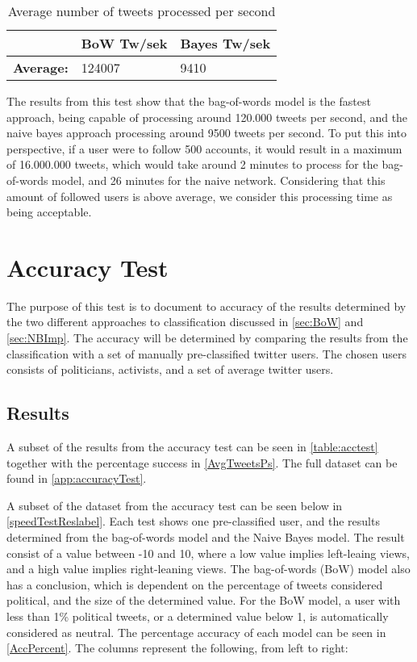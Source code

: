 \begin{table}[H]\centering
\begin{tabular}{|l|l|l|}\hline
					&	\textbf{BoW Tw/sek}	&	\textbf{Bayes Tw/sek}	\\\hline
\textbf{Average:}	&	124007				&	9410 					\\\hline	
\end{tabular}
\caption{Average number of tweets processed per second}
\label{AvgTweetsPs}
\end{table}

The results from this test show that the bag-of-words model is the fastest
approach, being capable of processing around 120.000 tweets per second, and the
naive bayes approach processing around 9500 tweets per second. To put this into
perspective, if a user were to follow 500 accounts, it would result in a maximum
of 16.000.000 tweets, which would take around 2 minutes to process for the
bag-of-words model, and 26 minutes for the naive network. Considering that this
amount of followed users is above average, we consider this processing time as
being acceptable.








\section{Accuracy Test}
The purpose of this test is to document to accuracy of the results determined
by the two different approaches to classification discussed in \autoref{sec:BoW}
and \autoref{sec:NBImp}. The accuracy will be determined by comparing the
results from the classification with a set of manually pre-classified
twitter users. The chosen users consists of politicians, activists, and a set of
average twitter users.

\subsection*{Results}
A subset of the results from the accuracy test can be seen in
\autoref{table:acctest} together with the percentage success in
\autoref{AvgTweetsPs}. The full dataset can be found in
\autoref{app:accuracyTest}.\nl

A subset of the dataset from the accuracy test can be seen below in
\autoref{speedTestReslabel}. Each test shows one pre-classified user, and the
results determined from the bag-of-words model and the Naive Bayes model. The
result consist of a value between -10 and 10, where a low value implies
left-leaing views, and a high value implies right-leaning views. The
bag-of-words (BoW) model also has a conclusion, which is dependent on the
percentage of tweets considered political, and the size of the determined value.
For the BoW model, a user with less than 1\% political tweets, or a determined
value below 1, is automatically considered as neutral. The percentage accuracy
of each model can be seen in \autoref{AccPercent}.
The columns represent the following, from left to right:\nl

